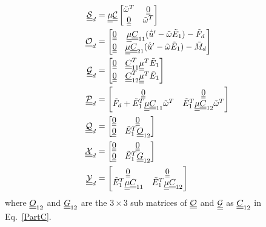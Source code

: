 \begin{align}
    \label{DampingSd}
    \underline{\underline{\mathcal{S}}}_d &= 
    \underline{\underline{\mu}} \underline{\underline{\mathcal{C}}} \begin{bmatrix}
    \tilde{\omega}^T & \underline{\underline{0}} \\
    \underline{\underline{0}} & \tilde{\omega}^T
    \end{bmatrix} \\
    \label{DampingOd}
    \underline{\underline{\mathcal{O}}}_d &= 
    \begin{bmatrix}
    \underline{\underline{0}} & \underline{\underline{\mu}} \underline{\underline{C}}_{11} (\dot{\tilde{u}}^\prime - \tilde{\omega} \tilde{E}_1) - \tilde{F}_d \\
    \underline{\underline{0}} &\underline{\underline{\mu}} \underline{\underline{C}}_{21} (\dot{\tilde{u}}^\prime - \tilde{\omega} \tilde{E}_1) - \tilde{M}_d
    \end{bmatrix} \\
    \label{DampingGd}
    \underline{\underline{\mathcal{G}}}_d &= 
    \begin{bmatrix}
    \underline{\underline{0}} & \underline{\underline{C}}_{11}^T \underline{\underline{\mu}}^T \tilde{E}_1 \\
    \underline{\underline{0}} & \underline{\underline{C}}_{12}^T \underline{\underline{\mu}}^T \tilde{E}_1 
    \end{bmatrix} \\
    \label{DampingPd}
    \underline{\underline{\mathcal{P}}}_d &= 
    \begin{bmatrix}
    \underline{\underline{0}} & \underline{\underline{0}}  \\
    \tilde{F}_d + \tilde{E}_1^T \underline{\underline{\mu}} \underline{\underline{C}}_{11} \tilde{\omega}^T &  \tilde{E}_1^T \underline{\underline{\mu}} \underline{\underline{C}}_{12} \tilde{\omega}^T 
    \end{bmatrix} \\
    \label{DampingQd}
    \underline{\underline{\mathcal{Q}}}_d &= 
    \begin{bmatrix}
    \underline{\underline{0}} & \underline{\underline{0}}  \\
    \underline{\underline{0}} &  \tilde{E}_1^T \underline{\underline{O}}_{12}
    \end{bmatrix} \\
    \label{DampingXd}
    \underline{\underline{\mathcal{X}}}_d &= 
    \begin{bmatrix}
    \underline{\underline{0}} & \underline{\underline{0}}  \\
     \underline{\underline{0}} &  \tilde{E}_1^T \underline{\underline{G}}_{12}
    \end{bmatrix} \\
    \label{DampingYd}
    \underline{\underline{\mathcal{Y}}}_d &= 
    \begin{bmatrix}
    \underline{\underline{0}} & \underline{\underline{0}}  \\
      \tilde{E}_1^T \underline{\underline{\mu}} \underline{\underline{C}}_{11} &   \tilde{E}_1^T \underline{\underline{\mu}} \underline{\underline{C}}_{12}
    \end{bmatrix} \\
\end{align}
where $\underline{\underline{O}}_{12}$ and $\underline{\underline{G}}_{12}$ are the $3 \times 3$ sub matrices of $\mathcal{\underline{\underline{O}}}$ and $\mathcal{\underline{\underline{G}}}$ as $\underline{\underline{C}}_{12}$ in Eq.~\eqref{PartC}.

